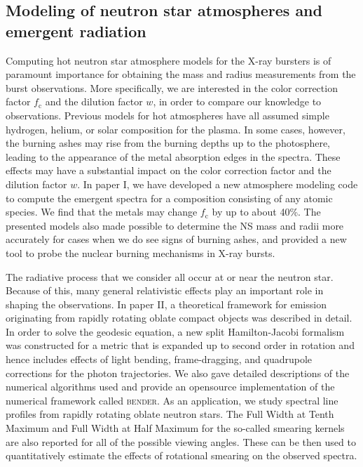 \subsection{Modeling of neutron star atmospheres and emergent radiation}

Computing hot neutron star atmosphere models for the X-ray bursters is of paramount importance for obtaining the mass and radius measurements from the burst observations.
More specifically, we are interested in the color correction factor $f_{\mathrm{c}}$ and the dilution factor $w$, in order to compare our knowledge to observations.
Previous models for hot atmospheres have all assumed simple hydrogen, helium, or solar composition for the plasma.
In some cases, however, the burning ashes may rise from the burning depths up to the photosphere, leading to the appearance of the metal absorption edges in the spectra.
These effects may have a substantial impact on the color correction factor and the dilution factor $w$.
In paper I, we have developed a new atmosphere modeling code to compute the emergent spectra for a composition consisting of any atomic species.
We find that the metals may change $f_{\mathrm{c}}$ by up to about 40\%.
The presented models also made possible to determine the NS mass and radii more accurately for cases when we do see signs of burning ashes, and provided a new tool to probe the nuclear burning mechanisms in X-ray bursts.

The radiative process that we consider all occur at or near the neutron star.
Because of this, many general relativistic effects play an important role in shaping the observations.
In paper II, a theoretical framework for emission originating from rapidly rotating oblate compact objects was described in detail.
In order to solve the geodesic equation, a new split Hamilton-Jacobi formalism was constructed for a metric that is expanded up to second order in rotation and hence includes effects of light bending, frame-dragging, and quadrupole corrections for the photon trajectories.
We also gave detailed descriptions of the numerical algorithms used and provide an opensource implementation of the numerical framework called \textsc{bender}.
As an application, we study spectral line profiles from rapidly rotating oblate neutron stars. 
The Full Width at Tenth Maximum and Full Width at Half Maximum for the so-called smearing kernels are also reported for all of the possible viewing angles.
These can be then used to quantitatively estimate the effects of rotational smearing on the observed spectra.


